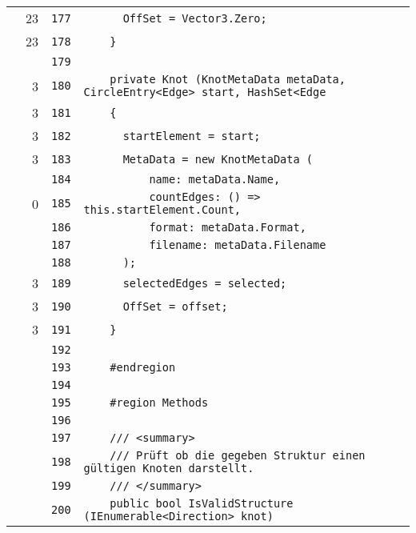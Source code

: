 \documentclass[a4paper,10pt]{article}
\begin{document}
\begin{longtable}[l]{lrrl}
\cellcolor{green} & 23 & \verb~177~ & \verb~      OffSet = Vector3.Zero;~\\
\cellcolor{green} & 23 & \verb~178~ & \verb~    }~\\
\cellcolor{gray} &  & \verb~179~ & \verb~~\\
\cellcolor{green} & 3 & \verb~180~ & \verb~    private Knot (KnotMetaData metaData, CircleEntry<Edge> start, HashSet<Edge~\\
\cellcolor{green} & 3 & \verb~181~ & \verb~    {~\\
\cellcolor{green} & 3 & \verb~182~ & \verb~      startElement = start;~\\
\cellcolor{green} & 3 & \verb~183~ & \verb~      MetaData = new KnotMetaData (~\\
\cellcolor{gray} &  & \verb~184~ & \verb~          name: metaData.Name,~\\
\cellcolor{red} & 0 & \verb~185~ & \verb~          countEdges: () => this.startElement.Count,~\\
\cellcolor{gray} &  & \verb~186~ & \verb~          format: metaData.Format,~\\
\cellcolor{gray} &  & \verb~187~ & \verb~          filename: metaData.Filename~\\
\cellcolor{gray} &  & \verb~188~ & \verb~      );~\\
\cellcolor{green} & 3 & \verb~189~ & \verb~      selectedEdges = selected;~\\
\cellcolor{green} & 3 & \verb~190~ & \verb~      OffSet = offset;~\\
\cellcolor{green} & 3 & \verb~191~ & \verb~    }~\\
\cellcolor{gray} &  & \verb~192~ & \verb~~\\
\cellcolor{gray} &  & \verb~193~ & \verb~    #endregion~\\
\cellcolor{gray} &  & \verb~194~ & \verb~~\\
\cellcolor{gray} &  & \verb~195~ & \verb~    #region Methods~\\
\cellcolor{gray} &  & \verb~196~ & \verb~~\\
\cellcolor{gray} &  & \verb~197~ & \verb~    /// <summary>~\\
\cellcolor{gray} &  & \verb~198~ & \verb~    /// Prüft ob die gegeben Struktur einen gültigen Knoten darstellt.~\\
\cellcolor{gray} &  & \verb~199~ & \verb~    /// </summary>~\\
\cellcolor{gray} &  & \verb~200~ & \verb~    public bool IsValidStructure (IEnumerable<Direction> knot)~\\

\end{longtable}
\end{document}
